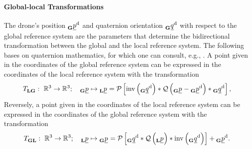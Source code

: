 \paragraph*{Global-local Transformations} $\ $\\
The drone's position
$\pos[]{\drone}{}{\grs}{}$
and quaternion orientation
$\quat[]{\drone}{}{\grs}{}$
with respect to the global reference system
are the parameters that determine the bidirectional transformation
between the global and the local reference system.
The following bases on quaternion mathematics,
for which one can consult, e.g., \cite{Parent}.
A point given in the coordinates of the global reference system
can be expressed in the coordinates of the local reference system
with the transformation
\begin{align} \label{equ:global_to_local_transformation}
    \trafo[]{}{\lrs\grs}{}{}
    :\ 
    \mathbb{R}^3 \rightarrow \mathbb{R}^3
    ; \quad
    \pos[]{}{}{\grs}{} \mapsto \pos[]{}{}{\lrs}{}
    =
        \mathcal{P} \left[
            \mathrm{inv} \left( \quat[]{\drone}{}{\grs}{} \right)
            *
            \mathcal{Q} \left( \pos[]{}{}{\grs}{} - \pos[]{\drone}{}{\grs}{} \right)
            *
            \quat[]{\drone}{}{\grs}{}
        \right], 
\end{align}
Reversely, a point given in the coordinates of the local reference system
can be expressed in the coordinates of the global reference system
with the transformation
\begin{align} \label{eq:local_to_global_transformation}
    \trafo[]{}{\grs\lrs}{}{}
    :\ 
    \mathbb{R}^3 \rightarrow \mathbb{R}^3
    ; \quad
    \pos[]{}{}{\lrs}{} \mapsto \pos[]{}{}{\grs}{}
    =
        \mathcal{P} \left[
            \quat[]{\drone}{}{\grs}{}
            *
            \mathcal{Q} \left( \pos[]{}{}{\lrs}{} \right)
            *
            \mathrm{inv} \left( \quat[]{\drone}{}{\grs}{} \right)
        \right] + \pos[]{\drone}{}{\grs}{}. 
\end{align}
